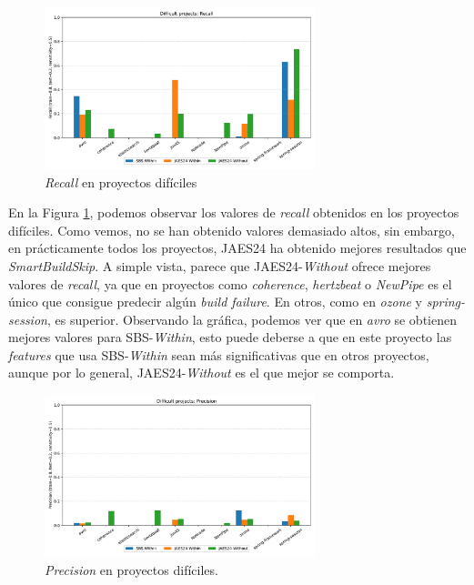 \begin{figure}[H]
    \centering
    \includegraphics[width=0.7\textwidth]{images/Difficult projects: Recall.pdf}
    \caption{\textit{Recall} en proyectos difíciles}
    \label{fig:train_test_recall_difficult_projects}
\end{figure}

En la Figura \ref{fig:train_test_recall_difficult_projects}, podemos observar los valores de
\textit{recall} obtenidos en los proyectos difíciles. Como vemos, no se han obtenido valores
demasiado altos, sin embargo, en prácticamente todos los proyectos, JAES24 ha obtenido
mejores resultados que \textit{SmartBuildSkip}. A simple vista, parece que JAES24-\textit{Without}
ofrece mejores valores de \textit{recall}, ya que en proyectos como \textit{coherence},
\textit{hertzbeat} o \textit{NewPipe} es el único que consigue predecir algún \textit{build
failure}. En otros, como en \textit{ozone} y \textit{spring-session}, es superior. Observando
la gráfica, podemos ver que en \textit{avro} se obtienen mejores valores para SBS-\textit{Within},
esto puede deberse a que en este proyecto las \textit{features} que usa SBS-\textit{Within} 
sean más significativas que en otros proyectos, aunque por lo general, JAES24-\textit{Without}
es el que mejor se comporta.\\

\begin{figure}[H]
    \centering
    \includegraphics[width=0.7\textwidth]{images/Difficult projects: Precision.pdf}
    \caption{\textit{Precision} en proyectos difíciles.}
    \label{fig:train_test_precision_difficult_projects}
\end{figure}

